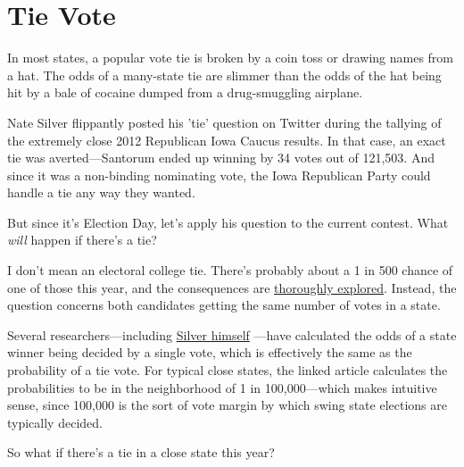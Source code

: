 {
\chapter{Tie Vote}
}

\hfill{}

{In most states, a popular vote tie is broken by a coin toss or drawing names from a hat. The odds of a many-state tie are slimmer than the odds of the hat being hit by a bale of cocaine dumped from a drug-smuggling airplane.}

{Nate Silver flippantly posted his 'tie' question on Twitter during the tallying of the extremely close 2012 Republican Iowa Caucus results. In that case, an exact tie was averted—Santorum ended up winning by 34 votes out of 121,503. And since it was a non-binding nominating vote, the Iowa Republican Party could handle a tie any way they wanted.}

{But since it’s Election Day, let’s apply his question to the current contest. What \emph{will} happen if there's a tie?}

{I don't mean an electoral college tie. There’s probably about a 1 in 500 chance of one of those this year, and the consequences are \href{http://blog.constitutioncenter.org/2012/11/an-electoral-college-tie-explained/}{thoroughly explored}. Instead, the question concerns both candidates getting the same number of votes in a state.}

{Several researchers—including \href{http://www.stat.columbia.edu/\~gelman/research/published/probdecisive2.pdf}{Silver himself} —have calculated the odds of a state winner being decided by a single vote, which is effectively the same as the probability of a tie vote. For typical close states, the linked article calculates the probabilities to be in the neighborhood of 1 in 100,000—which makes intuitive sense, since 100,000 is the sort of vote margin by which swing state elections are typically decided.}

{So what if there's a tie in a close state this year?}

